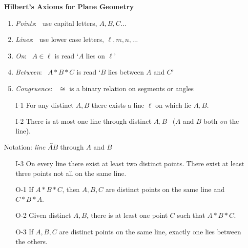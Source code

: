 \thispagestyle{empty}
\begin{center}
\bfseries\Large Hilbert's Axioms for Plane Geometry
\end{center}

\begin{minipage}[t]{0.46\linewidth}
\begin{enumerate}\itemsep2pt
  \item \emph{Points}: \ use capital letters, $A,B,C\ldots$
  \item \emph{Lines}: \ use lower case letters, $\ell,m,n,\ldots$
  \item \emph{On}: \ $A\in\ell$ is read `$A$ lies on $\ell$'
  \item \emph{Between}: \ $A*B*C$ is read `$B$ lies between $A$ and $C$'
  \item \emph{Congruence}: \ $\cong$ is a binary relation on segments or angles
\end{enumerate}


\begin{enumerate}
	\item[I-1] For any distinct $A,B$ there exists a line $\ell$ on which lie $A,B$.
	\item[I-2] There is at most one line through distinct $A,B$ \ ($A$ and $B$ both \emph{on} the line).
\end{enumerate}\vspace{-2pt}
	
Notation: \emph{line} $\overleftrightarrow{AB}$ through $A$ and $B$\vspace{-2pt}

\begin{enumerate}\setcounter{enumi}{2}	
	\item[I-3] On every line there exist at least two distinct points. There exist at least three points not all on the same line.
\end{enumerate}



\begin{enumerate}
	\item[O-1] If $A*B*C$, then $A,B,C$ are distinct points on the same line and $C*B*A$.
	\item[O-2] Given distinct $A,B$, there is at least one point $C$ such that $A*B*C$.
	\item[O-3] If $A,B,C$ are distinct points on the same line, exactly one lies between the others.
\end{enumerate}\vspace{-2pt}
	

\end{minipage}
